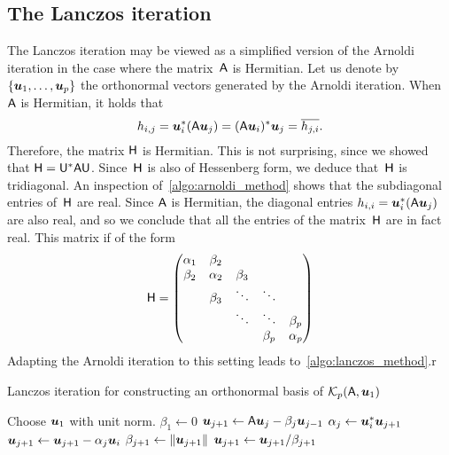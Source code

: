 \subsection{The Lanczos iteration}
The Lanczos iteration may be viewed as a simplified version of the Arnoldi iteration in the case where the matrix~$\mathsf A$ is Hermitian.
Let us denote by $\{ \mathbf{\boldsymbol{u}}_1, \dotsc, \mathbf{\boldsymbol{u}}_p \}$ the orthonormal vectors generated by the Arnoldi iteration.
When~$\mathsf A$ is Hermitian, it holds that
\[
    h_{i,j} = \mathbf{\boldsymbol{u}}_{i}^* (\mathsf A \mathbf{\boldsymbol{u}}_{j}) = (\mathsf A \mathbf{\boldsymbol{u}}_i)^* \mathbf{\boldsymbol{u}}_j = \overline{h_{j,i}}.
\]
Therefore, the matrix $\mathsf H$ is Hermitian.
This is not surprising, since we showed that $\mathsf H = \mathsf U^* \mathsf A \mathsf U$.
Since~$\mathsf H$ is also of Hessenberg form,
we deduce that~$\mathsf H$ is tridiagonal.
An inspection of~\cref{algo:arnoldi_method} shows that the subdiagonal entries of~$\mathsf H$ are real.
Since $\mathsf A$ is Hermitian, the diagonal entries $h_{i,i} = \mathbf{\boldsymbol{u}}_{i}^* (\mathsf A \mathbf{\boldsymbol{u}}_{j})$ are also real,
and so we conclude that all the entries of the matrix~$\mathsf H$ are in fact real.
This matrix if of the form
\[
    \mathsf H
    =
    \begin{pmatrix}
        \alpha_1 & \beta_2 \\
        \beta_2 & \alpha_2 & \beta_3 \\
            & \beta_3 & \ddots & \ddots \\
            & & \ddots & \ddots & \beta_p \\
            & & & \beta_p & \alpha_p
    \end{pmatrix}
\]
Adapting the Arnoldi iteration to this setting leads to~\cref{algo:lanczos_method}.r
\begin{algorithm}
\caption{Lanczos iteration for constructing an orthonormal basis of $\mathcal K_p(\mathsf A, \mathbf{\boldsymbol{u}}_1)$}%
\label{algo:lanczos_method}%
\begin{algorithmic}
\State Choose $\mathbf{\boldsymbol{u}}_1$ with unit norm.
\State $\beta_1 \gets 0$
    \State $\mathbf{\boldsymbol{u}}_{j+1} \gets \mathsf A \mathbf{\boldsymbol{u}}_{j} - \beta_j \mathbf{\boldsymbol{u}}_{j-1}$
    \State $\alpha_j \gets \mathbf{\boldsymbol{u}}_{i}^* \mathbf{\boldsymbol{u}}_{j+1}$
    \State $\mathbf{\boldsymbol{u}}_{j+1} \gets \mathbf{\boldsymbol{u}}_{j+1} - \alpha_j \mathbf{\boldsymbol{u}}_{i}$
    \State $\beta_{j+1} \gets \lVert\mathbf{\boldsymbol{u}}_{j+1}\rVert$
    \State $\mathbf{\boldsymbol{u}}_{j+1} \gets \mathbf{\boldsymbol{u}}_{j+1} / \beta_{j+1}$
\EndFor
\end{algorithmic}
\end{algorithm}

